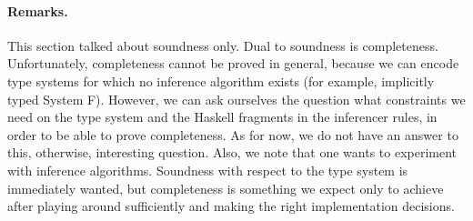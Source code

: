 \documentclass[preprint,natbib]{sigplanconf}
\begin{document}
  \paragraph{Remarks.}
  This section talked about soundness only. Dual to soundness is completeness. Unfortunately, completeness cannot be proved in
  general, because we can encode type systems for which no inference algorithm exists (for example, implicitly typed
  System F). However, we can ask ourselves the question what constraints we need on the type system and the Haskell fragments
  in the inferencer rules, in order to be able to prove completeness. As for now, we do not have an answer to this, otherwise,
  interesting question. Also, we note that one wants to experiment with inference algorithms. Soundness with respect to the
  type system is immediately wanted, but completeness is something we expect only to achieve after playing around sufficiently
  and making the right implementation decisions.
\end{document}
